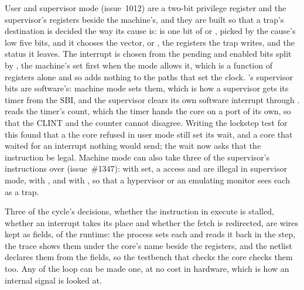 \documentclass[journal,onecolumn,9pt]{IEEEtran}
\begin{document}
User and supervisor mode (issue~1012) are a two-bit privilege register
and the supervisor's registers beside the machine's, and they are
built so that a trap's destination is decided the way its cause is:
 is one bit of  or , picked by
the cause's low five bits, and it chooses the vector,  or
, the registers the trap writes, and the status it
leaves. The interrupt is chosen from the pending and enabled bits
split by , the machine's set first when the mode allows
it, which is a function of registers alone and so adds nothing to
the paths that set the clock. 's supervisor bits are
software's: machine mode sets them, which is how a supervisor gets
its timer from the SBI, and the supervisor clears its own software
interrupt through .  reads the timer's count,
which the timer hands the core on a port of its own, so that the CLINT
and the counter cannot disagree. Writing the lockstep test for this
found that a  the core refused in user mode still set its
wait, and a core that waited for an interrupt nothing would send; the
wait now asks that the instruction be legal.
Machine mode can also take three of the supervisor's instructions
over (issue~\#1347): with  set, a  access
and  are illegal in supervisor mode, with 
, and with  , so that a hypervisor or
an emulating monitor sees each as a trap.

Three of the cycle's decisions, whether the instruction in execute
is stalled, whether an interrupt takes its place and whether the
fetch is redirected, are wires kept as fields,  of
the runtime: the process sets each and reads it back in the step, the
trace shows them under the core's name beside the registers, and the
netlist declares them from the fields, so the testbench that checks
the core checks them too. Any  of the loop can be made
one, at no cost in hardware, which is how an internal signal is
looked at.
\end{document}
